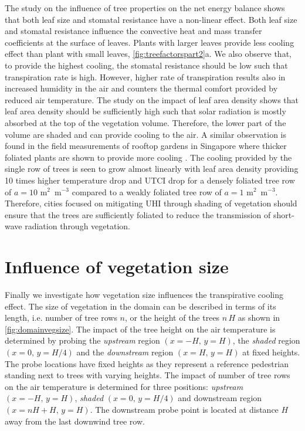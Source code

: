 The study on the influence of tree properties on the net energy balance shows that both leaf size and stomatal resistance have a non-linear effect. Both leaf size and stomatal resistance influence the convective heat and mass transfer coefficients at the surface of leaves. Plants with larger leaves provide less cooling effect than plant with small leaves, \cref{fig:treefactorspart2}a. We also observe that, to provide the highest cooling, the stomatal resistance should be low such that transpiration rate is high. However, higher rate of transpiration results also in increased humidity in the air and counters the thermal comfort provided by reduced air temperature. The study on the impact of leaf area density shows that leaf area density should be sufficiently high such that solar radiation is mostly absorbed at the top of the vegetation volume. Therefore, the lower part of the volume are shaded and can provide cooling to the air. A similar observation is found in the field measurements of rooftop gardens in Singapore where thicker foliated plants are shown to provide more cooling \citep{Wong2003}. The cooling provided by the single row of trees is seen to grow almost linearly with leaf area density providing 10 times higher temperature drop and UTCI drop for a densely foliated tree row of $a=10$ m$^2$~m$^{-3}$ compared to a weakly foliated tree row of $a=1$ m$^2$~m$^{-3}$. Therefore, cities focused on mitigating UHI through shading of vegetation should ensure that the trees are sufficiently foliated to reduce the transmission of short-wave radiation through vegetation. 

\section{Influence of vegetation size}

Finally we investigate how vegetation size influences the transpirative cooling effect. The size of vegetation in the domain can be described in terms of its length, i.e. number of tree rows $n$, or the height of the trees $n\,H$ as shown in \cref{fig:domainvegsize}. The impact of the tree height on the air temperature is determined by probing the \textit{upstream} region $\left(x = -H,\, y = H\right)$, the \textit{shaded} region $\left(x = 0,\, y = H/4\right)$ and the \textit{downstream} region $\left(x=H,\, y=H \right)$ at fixed heights. The probe locations have fixed heights as they represent a reference pedestrian standing next to trees with varying heights. The impact of number of tree rows on the air temperature is determined for three positions: \textit{upstream} $\left(x=-H,\, y=H \right)$, \textit{shaded} $\left(x=0,\, y=H/4 \right)$ and downstream region $\left( x= nH+H,\, y=H\right)$. The downstream probe point is located at distance $H$ away from the last downwind tree row.

